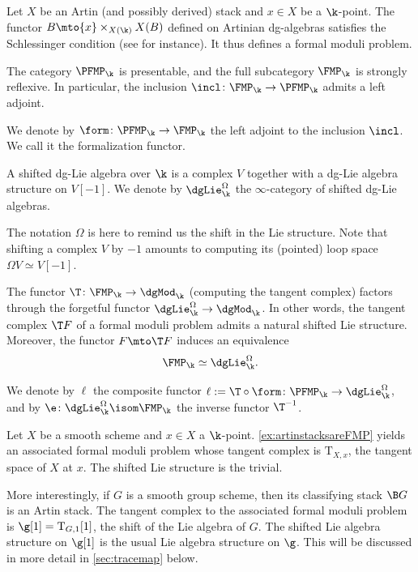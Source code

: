 \begin{ex}\label{ex:artinstacksareFMP}
Let $X$ be an Artin (and possibly derived) stack and $x \in X$ be a $\k$-point. The functor $B \mto \{ x\} \times_{X(\k)} X(B)$ defined on Artinian dg-algebras satisfies the Schlessinger condition (see \cite{toen:hagii} for instance). It thus defines a formal moduli problem.
\end{ex}

The category $\PFMP_\k$ is presentable, and the full subcategory $\FMP_\k$ is strongly reflexive. In particular, the inclusion $\incl \colon \FMP_\k \to \PFMP_\k$ admits a left adjoint.
\begin{df}
We denote by $\form \colon \PFMP_\k \to \FMP_\k$ the left adjoint to the inclusion $\incl$. We call it the formalization functor.
\end{df}

\begin{df}
A shifted dg-Lie algebra over $\k$ is a complex $V$ together with a dg-Lie algebra structure on $V[-1]$. We denote by $\dgLie_\k^{\Omega}$ the $\infty$-category of shifted dg-Lie algebras.
\end{df}

\begin{rmq}
The notation $\Omega$ is here to remind us the shift in the Lie structure. Note that shifting a complex $V$ by $-1$ amounts to computing its (pointed) loop space $\Omega V \simeq V[-1]$.
\end{rmq}

\begin{thm}\label{thm:pridhamlurie}
The functor $\T \colon \FMP_\k \to \dgMod_\k$ (computing the tangent complex) factors through the forgetful functor $\dgLie_\k^\Omega \to \dgMod_\k$. In other words, the tangent complex $\T F$ of a formal moduli problem admits a natural shifted Lie structure. Moreover, the functor $F \mto \T F$ induces an equivalence
\[
\FMP_\k \simeq \dgLie_\k^{\Omega}.
\]
\end{thm}

\begin{df}
We denote by $\ell$ the composite functor $\ell := \T \circ \form \colon \PFMP_\k \to \dgLie_\k^\Omega$, and by $\e \colon \dgLie_\k^\Omega \isom \FMP_\k$ the inverse functor $\T^{-1}$.
\end{df}

\begin{ex}\label{ex:tgtcoincides}
Let $X$ be a smooth scheme and $x \in X$ a $\k$-point. \autoref{ex:artinstacksareFMP} yields an associated formal moduli problem whose tangent complex is $\mathrm T_{X,x}$, the tangent space of $X$ at $x$. The shifted Lie structure is the trivial.

More interestingly, if $G$ is a smooth group scheme, then its classifying stack $\B G$ is an Artin stack. The tangent complex to the associated formal moduli problem is $\g[1] = \mathrm T_{G, 1}[1]$, the shift of the Lie algebra of $G$. The shifted Lie algebra structure on $\g[1]$ is the usual Lie algebra structure on $\g$. This will be discussed in more detail in \autoref{sec:tracemap} below.
\end{ex}


